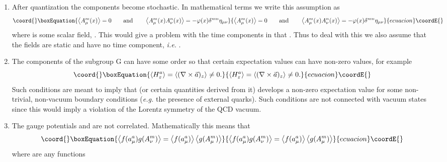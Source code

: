 \documentclass[a4paper,aps,showpacs]{revtex4}
\begin{document}
\begin{enumerate}
  \item
  After quantization the components \coordHE{}
  become stochastic. In mathematical terms we write this
  assumption as
\begin{equation}\coord{}\boxEquation{
  \left\langle A^m_\mu (x) \right\rangle = 0
  \qquad \text{and} \qquad
  \left\langle
  A^m_\mu (x) A^n_\nu (x) \right\rangle =
  - \varphi (x) \delta ^{mn} \eta _{\mu\nu}
  \label{sec5-10}
}{
  \left\langle A^m_\mu (x) \right\rangle = 0
  \qquad \text{and} \qquad
  \left\langle
  A^m_\mu (x) A^n_\nu (x) \right\rangle =
  - \varphi (x) \delta ^{mn} \eta _{\mu\nu}
  }{ecuacion}\coordE{}\end{equation}
  where \coordHE{} is some scalar field,
  \coordHE{}. This would give a problem with
  the time components in that \coordHE{}.
  Thus to deal with this we also assume that the fields are static and
  have no time component, {\it i.e.} \coordHE{}.
  \item
  The components \coordHE{} of the subgroup G can have some order so that
  certain expectation values can have non-zero values, for example
\begin{equation}\coord{}\boxEquation{
  \left\langle H^a_z \right\rangle =
  \left\langle (\nabla \times \vec{a})_z  \right\rangle \neq 0 .
\label{sec5-20}
}{
  \left\langle H^a_z \right\rangle =
  \left\langle (\nabla \times \vec{a})_z  \right\rangle \neq 0 .
}{ecuacion}\coordE{}\end{equation}
   Such conditions are meant to imply that \coordHE{} (or
   certain quantities derived from it) develops a non-zero
   expectation value for some non-trivial, non-vacuum
   boundary conditions ({\it e.g.} the presence of external
   quarks). Such conditions are not connected with vacuum states
   since this would imply a violation of the Lorentz symmetry
   of the QCD vacuum.
  \item
  The gauge potentials \coordHE{} and \coordHE{} are not correlated.
  Mathematically this means that
\begin{equation}\coord{}\boxEquation{
  \left\langle f(a^a_\mu) g(A^m_\nu) \right\rangle =
  \left\langle f(a^a_\mu) \right\rangle
  \left\langle g(A^m_\mu) \right\rangle
\label{sec5-30}
}{
  \left\langle f(a^a_\mu) g(A^m_\nu) \right\rangle =
  \left\langle f(a^a_\mu) \right\rangle
  \left\langle g(A^m_\mu) \right\rangle
}{ecuacion}\coordE{}\end{equation}
  where \coordHE{} are any functions
\end{enumerate}
\end{document}
